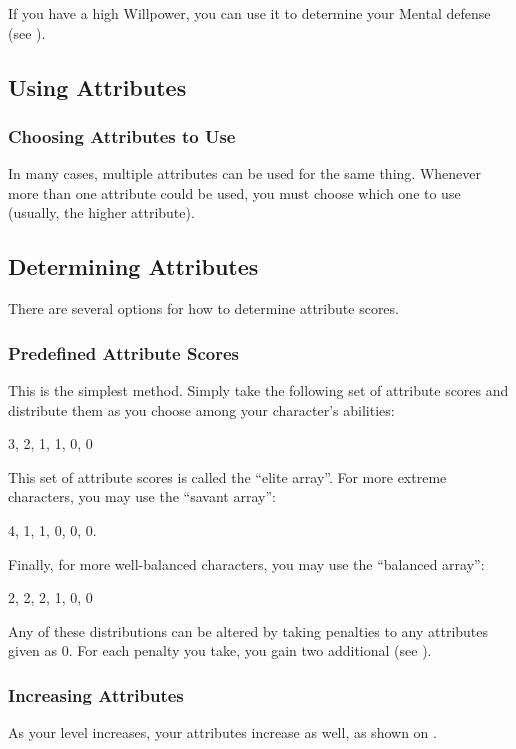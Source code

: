            If you have a high Willpower, you can use it to determine your Mental defense (see ).

    \subsection{Using Attributes}

        \subsubsection{Choosing Attributes to Use}
            In many cases, multiple attributes can be used for the same thing.
            Whenever more than one attribute could be used, you must choose which one to use (usually, the higher attribute).

    \subsection{Determining Attributes}
        There are several options for how to determine attribute scores.

        \subsubsection{Predefined Attribute Scores}
            This is the simplest method.
            Simply take the following set of attribute scores and distribute them as you choose among your character's abilities:

            3, 2, 1, 1, 0, 0

            This set of attribute scores is called the ``elite array''.
            For more extreme characters, you may use the ``savant array'':

            4, 1, 1, 0, 0, 0.

            Finally, for more well-balanced characters, you may use the ``balanced array'':

            2, 2, 2, 1, 0, 0

            Any of these distributions can be altered by taking penalties to any attributes given as 0.
            For each penalty you take, you gain two additional  (see ).

        \subsubsection{Increasing Attributes}
            As your level increases, your attributes increase as well, as shown on .

